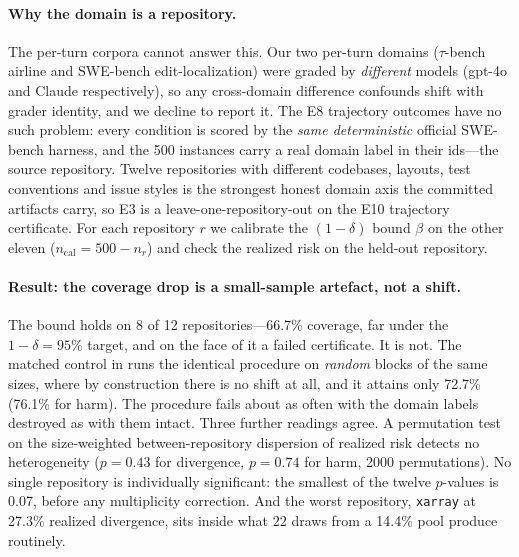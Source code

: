 \documentclass[11pt]{article}
\newcommand{\LooN}{500}          \newcommand{\LooDomains}{12}
\newcommand{\LooCandidate}{\texttt{distil\_gated}} \newcommand{\LooDelta}{0.05}
\newcommand{\LooPooled}{14.4\%}  \newcommand{\LooHeld}{8}
\newcommand{\LooCoverage}{66.7\%} \newcommand{\LooExchCoverage}{72.7\%}
\newcommand{\LooWorstDomain}{\texttt{xarray}} \newcommand{\LooWorstRisk}{27.3\%}
\newcommand{\LooDispP}{0.43}     \newcommand{\LooMinP}{0.07}
\newcommand{\LooReps}{2000}
\newcommand{\LooHarmExchCoverage}{76.1\%} \newcommand{\LooHarmDispP}{0.74}
\begin{document}
\paragraph{Why the domain is a repository.} The per-turn corpora cannot answer this. Our two
per-turn domains ($\tau$-bench airline and SWE-bench edit-localization) were graded by
\emph{different} models (gpt-4o and Claude respectively), so any cross-domain difference
confounds shift with grader identity, and we decline to report it. The E8 trajectory
outcomes have no such problem: every condition is scored by the \emph{same deterministic}
official SWE-bench harness, and the \LooN{} instances carry a real domain label in their
ids---the source repository. Twelve repositories with different codebases, layouts, test
conventions and issue styles is the strongest honest domain axis the committed artifacts
carry, so E3 is a leave-one-repository-out on the E10 trajectory certificate. For each
repository $r$ we calibrate the $(1{-}\delta)$ bound $\beta$ on the other eleven
($n_{\text{cal}} = \LooN - n_r$) and check the realized risk on the held-out repository.

\begin{table}[t]
\centering\small
\caption{\textbf{E3: leave-one-repository-out} on the E10 trajectory certificate
(\LooCandidate{} vs.\ full, $n{=}\LooN$, $\delta{=}\LooDelta$, pooled divergence
\LooPooled{}). ``exch.\ cov.'' is the matched control: the identical certify-then-check
procedure applied to a \emph{random} block of the same size, over \LooReps{} permutations---the
yardstick the ``held?'' column has to be read against. $p$ is the permutation
probability that a random same-sized block reaches this repository's realized risk.
Per-repository \emph{savings} is absent because the E8 run recorded context reduction only
in aggregate ($52.8\%$ for the gated tier); it is not recoverable per instance from the
committed artifacts.}
\label{tab:e3}

\end{table}

\paragraph{Result: the coverage drop is a small-sample artefact, not a shift.} The bound
holds on \LooHeld{} of \LooDomains{} repositories---\LooCoverage{} coverage, far under the
$1-\delta = 95\%$ target, and on the face of it a failed certificate. It is not. The
matched control in  runs the identical procedure on \emph{random} blocks of
the same sizes, where by construction there is no shift at all, and it attains only
\LooExchCoverage{} (\LooHarmExchCoverage{} for harm). The procedure fails about as often
with the domain labels destroyed as with them intact. Three further readings agree. A
permutation test on the size-weighted between-repository dispersion of realized risk
detects no heterogeneity ($p=\LooDispP$ for divergence, $p=\LooHarmDispP$ for harm,
\LooReps{} permutations). No single repository is individually significant: the smallest of
the twelve $p$-values is \LooMinP{}, before any multiplicity correction. And the worst
repository, \LooWorstDomain{} at \LooWorstRisk{} realized divergence, sits inside what $22$
draws from a \LooPooled{} pool produce routinely.
\end{document}
